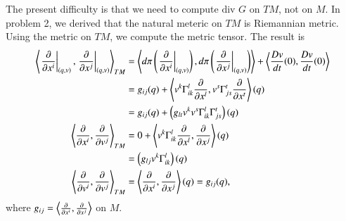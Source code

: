 \documentclass[a4paper, 12pt]{article}
\theoremstyle{Mydefinition}
\theoremstyle{Mytheorem}
\begin{document}
\begin{enumerate}
    The present difficulty is that we need to compute $\textrm{div }G$ on $TM$, not on $M$. In problem 2, we derived that the natural meteric on $TM$ is Riemannian metric. Using the metric on $TM$, we compute the metric tensor. The result is
    \begin{equation}
    \begin{split}
        \left\langle \left.\pdv{x^i}\right|_{(q,v)}, \left.\pdv{x^j}\right|_{(q,v)} \right\rangle_{TM} &= \left\langle d\pi\left(\left.\pdv{x^i}\right|_{(q,v)}\right), d\pi\left(\left.\pdv{x^j}\right|_{(q,v)}\right) \right\rangle + \left\langle \frac{Dv}{dt}(0), \frac{Dv}{dt}(0) \right\rangle \\
        &= g_{ij}(q) + \left\langle v^k\Gamma_{ik}^l\pdv{x^l}, v^s\Gamma_{js}^t \pdv{x^t} \right\rangle(q)\\
        &=g_{ij}(q) + \left(g_{lt} v^kv^s\Gamma_{ik}^l\Gamma_{js}^t\right)(q)\\
        \left\langle \pdv{x^i}, \pdv{v^j} \right\rangle_{TM} &= 0 + \left\langle v^k\Gamma_{ik}^l\pdv{x^l}, \pdv{x^j} \right\rangle(q)\\
        &=\left(g_{lj}v^k\Gamma_{ik}^l\right)(q)\\
        \left\langle \pdv{v^i}, \pdv{v^j} \right\rangle_{TM} &= \left\langle \pdv{x^i}, \pdv{x^j} \right\rangle(q) = g_{ij}(q),
    \end{split}
    \end{equation}
    where $g_{ij} = \left\langle \pdv{x^i}, \pdv{x^j}\right\rangle$ on $M$.
    

\end{enumerate}
\end{document}
